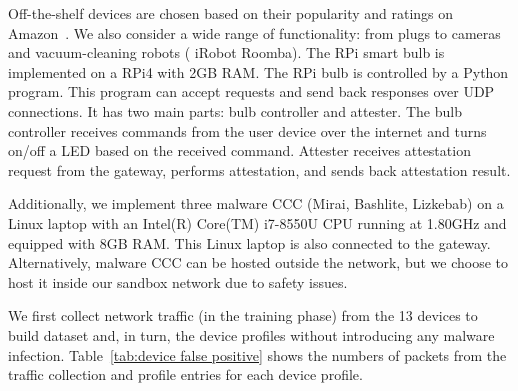 Off-the-shelf devices are chosen based on their popularity and ratings on Amazon~\cite{amazon}. We also consider a wide range of functionality: from plugs to cameras and vacuum-cleaning robots (\ie{} iRobot Roomba). The RPi smart bulb is implemented on a RPi4 with 2GB RAM. 
The RPi bulb is controlled by a Python program. This program can accept requests and send back responses over UDP connections. It has two main parts: bulb controller and attester. The bulb controller receives commands from the user device over the internet and turns on/off a LED based on the received command. Attester receives attestation request from the gateway, performs attestation, and sends back attestation result.

Additionally, we implement three malware CCC (Mirai, Bashlite, Lizkebab) on a Linux laptop with an Intel(R) Core(TM) i7-8550U CPU running at 1.80GHz and equipped with 8GB RAM. This Linux laptop is also connected to the gateway. Alternatively, malware CCC can be hosted outside the network, but we choose to host it inside our sandbox network due to safety issues.

We first collect network traffic (in the training phase) from the 13 devices to build \system{} dataset and, in turn, the device profiles without introducing any malware infection. 
Table~\ref{tab:device false positive} shows the numbers of packets from the traffic collection and profile entries for each device profile.

